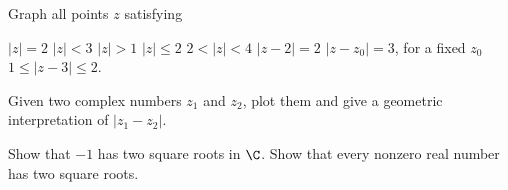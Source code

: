 \begin{exercises}
Graph all points $z$ satisfying
\begin{exenum}
\x
$|z|=2$
\x
$|z|<3$
\x
$|z|>1$
\x
$|z|\leq2$
\x
$2<|z|<4$
\x
$|z-2|=2$
\x
$|z-z_0|=3$, for a fixed $z_0$
\x
$1\leq|z-3|\leq2$.
\end{exenum}

Given two complex numbers $z_1$ and $z_2$,
plot them and give a geometric interpretation
of $|z_1-z_2|$.

\begin{exenum}
\x
Show that $-1$ has two square roots in $\C$.
\x
Show that every nonzero real number has two
square roots.
\end{exenum}

\end{exercises}
